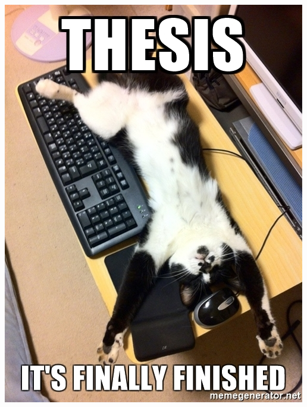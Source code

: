 \documentclass[letter]{book}
\begin{document}





\includegraphics[width=\linewidth]{thesis-its-finally-finished}




\printbibliography
{}


\appendix

\backmatter
\end{document}
